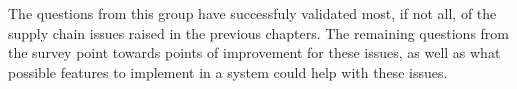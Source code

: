 The questions from this group have successfuly validated most, if not all, of the supply chain issues raised in the previous chapters. The remaining questions from the survey point towards points of improvement for these issues, as well as what possible features to implement in a system could help with these issues.
